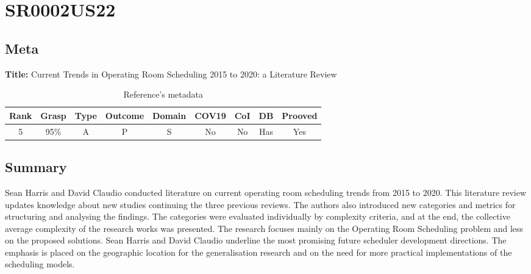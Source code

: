 \section{ SR0002US22 }


\subsection{Meta}

    \textbf{Title:}
    Current Trends in Operating Room Scheduling 2015 to 2020: a Literature Review

    \begin{table}[H]
        \centering
        \begin{tabular}{|c|c|c|c|c|c|c|c|c|}
            \hline
                \textbf{Rank} & \textbf{Grasp} & \textbf{Type} & \textbf{Outcome} & \textbf{Domain} & \textbf{COV19} & \textbf{CoI} & \textbf{DB} & \textbf{Prooved} \\
            \hline
                5 & 95\% & A & P & S & No & No & Has & Yes \\
            \hline
        \end{tabular}
        \caption{Reference's metadata}
        \label{tab:SR0002US22}
    \end{table}

\subsection{Summary}
Sean Harris and David Claudio \cite{x079} conducted literature on current operating room scheduling trends from 2015 to 2020. This literature review updates knowledge about new studies continuing the three previous reviews. The authors also introduced new categories and metrics for structuring and analysing the findings. The categories were evaluated individually by complexity criteria, and at the end, the collective average complexity of the research works was presented. The research focuses mainly on the Operating Room Scheduling problem and less on the proposed solutions. Sean Harris and David Claudio underline the most promising future scheduler development directions. The emphasis is placed on the geographic location for the generalisation research and on the need for more practical implementations of the scheduling models.


